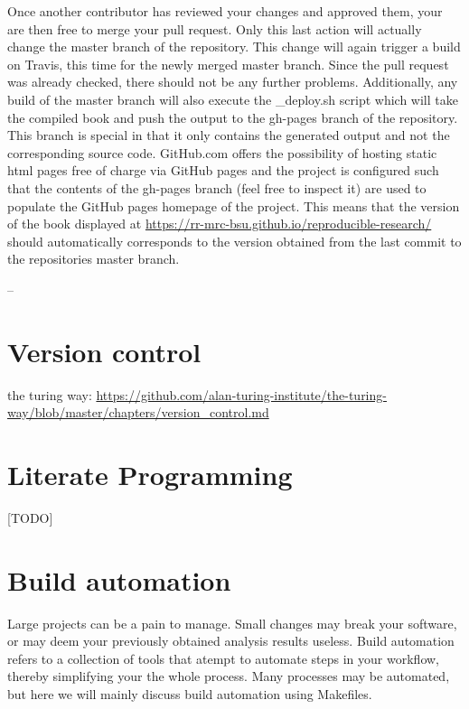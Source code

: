 \documentclass[]{book}
\begin{document}
Once another contributor has reviewed your changes and approved them,
your are then free to merge your pull request. Only this last action
will actually change the master branch of the repository. This change
will again trigger a build on Travis, this time for the newly merged
master branch. Since the pull request was already checked, there should
not be any further problems. Additionally, any build of the master
branch will also execute the \_deploy.sh script which will take the
compiled book and push the output to the gh-pages branch of the
repository. This branch is special in that it only contains the
generated output and not the corresponding source code. GitHub.com
offers the possibility of hosting static html pages free of charge via
GitHub pages and the project is configured such that the contents of the
gh-pages branch (feel free to inspect it) are used to populate the
GitHub pages homepage of the project. This means that the version of the
book displayed at
\url{https://rr-mrc-bsu.github.io/reproducible-research/} should
automatically corresponds to the version obtained from the last commit
to the repositories master branch.

--

\chapter{Version control}\label{chptr-version-control}

the turing way:
\url{https://github.com/alan-turing-institute/the-turing-way/blob/master/chapters/version_control.md}

\chapter{Literate Programming}\label{chptr-literate-programming}

{[}TODO{]}

\chapter{Build automation}\label{chptr-workflow-automation}

Large projects can be a pain to manage. Small changes may break your
software, or may deem your previously obtained analysis results useless.
Build automation refers to a collection of tools that atempt to automate
steps in your workflow, thereby simplifying your the whole process. Many
processes may be automated, but here we will mainly discuss build
automation using Makefiles.
\end{document}
